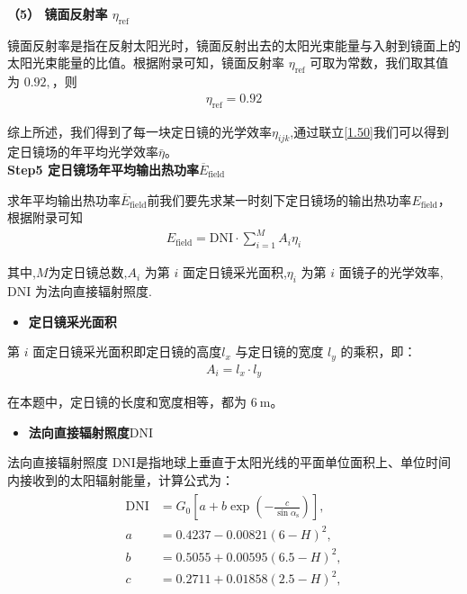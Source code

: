 \documentclass[../main.tex]{subfiles}
\begin{document}
\par \textbf{（5） 镜面反射率 $\eta_{\text{ref}}$}
\par 镜面反射率是指在反射太阳光时，镜面反射出去的太阳光束能量与入射到镜面上的太阳光束能量的比值。根据附录可知，镜面反射率 $\eta_{\text{ref}}$ 可取为常数，我们取其值为 $0.92,$，则
\begin{align}\label{1.46}
  \eta_{\text{ref}}=0.92
\end{align}
\par 综上所述，我们得到了每一块定日镜的光学效率\(\eta_{ijk}\),通过联立\eqref{1.50}我们可以得到定日镜场的年平均光学效率\(\bar{\eta}\)。
 \\ \noindent \textbf{Step5 定日镜场年平均输出热功率$\overline{E}_{\text{field}}$}
 \par 求年平均输出热功率$\overline{E}_{\text{field}}$前我们要先求某一时刻下定日镜场的输出热功率$E_{\text{field}}$，根据附录可知
 \begin{align}\label{1.47}
  E_{\text{field}} = \text{DNI} \cdot \sum_{i = 1}^{M} A_i \eta_i
 \end{align}
\par 其中,$M$为定日镜总数,$A_i$ 为第 $i$ 面定日镜采光面积,$\eta_i$ 为第 $i$ 面镜子的光学效率,$\text{DNI}$ 为法向直接辐射照度.
\begin{itemize}
  \item \textbf{定日镜采光面积}
\end{itemize}
\par 第 $i$ 面定日镜采光面积即定日镜的高度\( l_x \) 与定日镜的宽度 \( l_y \) 的乘积，即：
\begin{align}\label{1.48}
  A_i = l_x \cdot l_y
 \end{align}
\par 在本题中，定日镜的长度和宽度相等，都为 \( 6\ \text{m} \)。
\begin{itemize}
  \item \textbf{法向直接辐射照度$\text{DNI}$ }
\end{itemize}
\par 法向直接辐射照度 $\text{DNI}$是指地球上垂直于太阳光线的平面单位面积上、单位时间内接收到的太阳辐射能量，计算公式为：
\begin{align}\label{1.49}
\begin{split}
\text{DNI} &= G_0 \left[ a + b \exp\left(-\frac{c}{\sin\alpha_{\text{s}}}\right) \right], \\
a &= 0.4237 - 0.00821(6 - H)^2, \\
b &= 0.5055 + 0.00595(6.5 - H)^2, \\
c &= 0.2711 + 0.01858(2.5 - H)^2,
\end{split}
\end{align}
\end{document}
